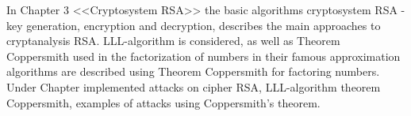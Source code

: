 In Chapter 3 <<Cryptosystem RSA>> the basic algorithms cryptosystem RSA - key generation, encryption and decryption, describes the main
approaches to cryptanalysis RSA. LLL-algorithm is considered, as well as Theorem Coppersmith used in the factorization of numbers in their famous
approximation algorithms are described using Theorem Coppersmith for factoring numbers. Under Chapter implemented attacks on cipher RSA, LLL-algorithm theorem
Coppersmith, exampl\-es of attacks using Coppersmith's theorem.